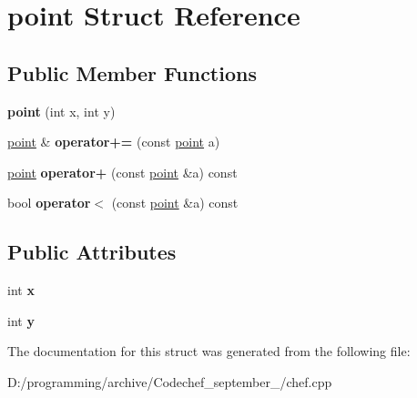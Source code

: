 \hypertarget{structpoint}{}\section{point Struct Reference}
\label{structpoint}
\subsection*{Public Member Functions}
\begin{DoxyCompactItemize}
\item 
\mbox{\label{structpoint_a21530dc3320ad8450677d8065c9044ee}} 
{\bfseries point} (int x, int y)
\item 
\mbox{\label{structpoint_a14c4cb1c6dcad24b1d821dd3cb0682ee}} 
\mbox{\hyperlink{structpoint}{point}} \& {\bfseries operator+=} (const \mbox{\hyperlink{structpoint}{point}} a)
\item 
\mbox{\label{structpoint_a4561bd742fb6d5b64fa2206f31316af6}} 
\mbox{\hyperlink{structpoint}{point}} {\bfseries operator+} (const \mbox{\hyperlink{structpoint}{point}} \&a) const
\item 
\mbox{\label{structpoint_a6982973083e0b2d94b69f9c4d396fb97}} 
bool {\bfseries operator$<$} (const \mbox{\hyperlink{structpoint}{point}} \&a) const
\end{DoxyCompactItemize}
\subsection*{Public Attributes}
\begin{DoxyCompactItemize}
\item 
\mbox{\label{structpoint_ad679b07fb69d55f5ad454d0f1f2891d5}} 
int {\bfseries x}
\item 
\mbox{\label{structpoint_a9a82ca9504acabb1e30569f89c805471}} 
int {\bfseries y}
\end{DoxyCompactItemize}


The documentation for this struct was generated from the following file\+:\begin{DoxyCompactItemize}
\item 
D\+:/programming/archive/\+Codechef\+\_\+september\+\_/chef.\+cpp\end{DoxyCompactItemize}
